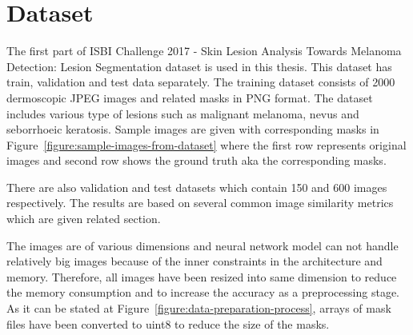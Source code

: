 \section{Dataset}\label{section:dataset}

The first part of ISBI Challenge 2017 \cite{codella2018skin} - Skin Lesion Analysis Towards Melanoma Detection: Lesion Segmentation dataset is used in this thesis.
This dataset has train, validation and test data separately.
The training dataset consists of 2000 dermoscopic JPEG images and related masks in PNG format.
The dataset includes various type of lesions such as malignant melanoma, nevus and seborrhoeic keratosis.
Sample images are given with corresponding masks in Figure~\ref{figure:sample-images-from-dataset} where the first row represents original images and second row shows the ground truth aka the corresponding masks.



There are also validation and test datasets which contain 150 and 600 images respectively.
The results are based on several common image similarity metrics which are given related section.



The images are of various dimensions and  neural network model can not handle relatively big images because of the inner constraints in the architecture and memory.
Therefore, all images have been resized into same dimension to reduce the memory consumption and to increase the accuracy as a preprocessing stage.
As it can be stated at Figure~\ref{figure:data-preparation-process}, arrays of mask files have been converted to uint8 to reduce the size of the masks.
